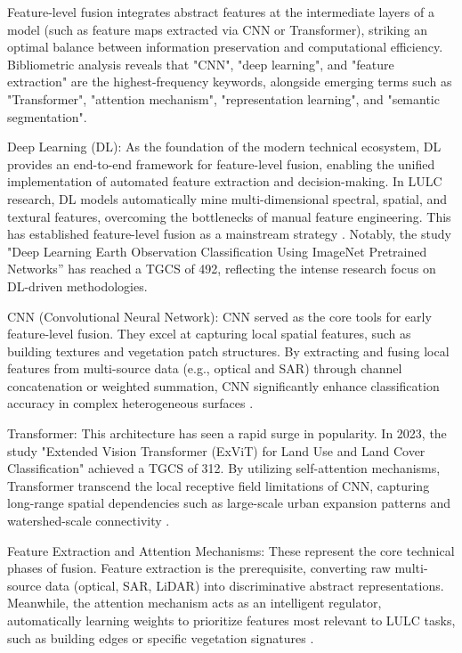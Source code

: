 \documentclass[]{interact}
\theoremstyle{plain}%
\theoremstyle{definition}
\theoremstyle{remark}
\begin{document}
Feature-level fusion integrates abstract features at the intermediate layers of a model (such as feature maps extracted via CNN or Transformer), striking an optimal balance between information preservation and computational efficiency. Bibliometric analysis reveals that "CNN", "deep learning", and "feature extraction" are the highest-frequency keywords, alongside emerging terms such as "Transformer", "attention mechanism", "representation learning", and "semantic segmentation".

Deep Learning (DL): As the foundation of the modern technical ecosystem, DL provides an end-to-end framework for feature-level fusion, enabling the unified implementation of automated feature extraction and decision-making. In LULC research, DL models automatically mine multi-dimensional spectral, spatial, and textural features, overcoming the bottlenecks of manual feature engineering. This has established feature-level fusion as a mainstream strategy \citep{42, 43}. Notably, the study "Deep Learning Earth Observation Classification Using ImageNet Pretrained Networks” \citep{28} has reached a TGCS of 492, reflecting the intense research focus on DL-driven methodologies.

\medskip %
CNN (Convolutional Neural Network): CNN served as the core tools for early feature-level fusion. They excel at capturing local spatial features, such as building textures and vegetation patch structures. By extracting and fusing local features from multi-source data (e.g., optical and SAR) through channel concatenation or weighted summation, CNN significantly enhance classification accuracy in complex heterogeneous surfaces \citep{41}.

\medskip
Transformer: This architecture has seen a rapid surge in popularity. In 2023, the study "Extended Vision Transformer (ExViT) for Land Use and Land Cover Classification" \citep{36} achieved a TGCS of 312. By utilizing self-attention mechanisms, Transformer transcend the local receptive field limitations of CNN, capturing long-range spatial dependencies such as large-scale urban expansion patterns and watershed-scale connectivity \citep{45}.

\medskip
Feature Extraction and Attention Mechanisms: These represent the core technical phases of fusion. Feature extraction is the prerequisite, converting raw multi-source data (optical, SAR, LiDAR) into discriminative abstract representations. Meanwhile, the attention mechanism acts as an intelligent regulator, automatically learning weights to prioritize features most relevant to LULC tasks, such as building edges or specific vegetation signatures \citep{46, 47}.
\end{document}
